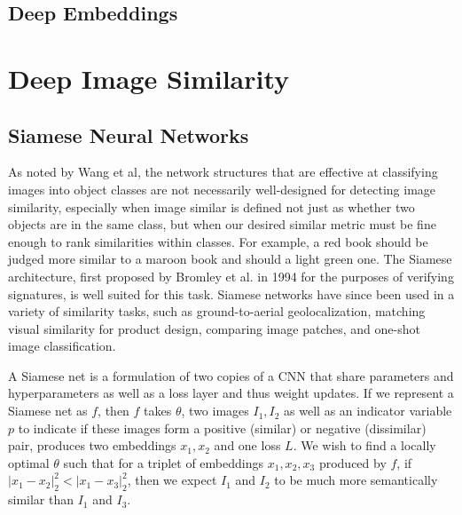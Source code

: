  \subsection{Deep Embeddings}
%


\section{Deep Image Similarity}
\subsection{Siamese Neural Networks}

As noted by Wang et al\cite{wang2014learning}, the network structures that are effective at classifying images into object classes are not necessarily well-designed for detecting image similarity, especially when image similar is defined not just as whether two objects are in the same class, but when our desired similar metric must be fine enough to rank similarities within classes. For example, a red book should be judged more similar to a maroon book and should a light green one. The Siamese architecture, first proposed by Bromley et al. in 1994\cite{bromley1993signature} for the purposes of verifying signatures, is well suited for this task. Siamese networks have since been used in a variety of similarity tasks, such as ground-to-aerial geolocalization\cite{lin2015learning}, matching visual similarity for product design\cite{bell2015learning}, comparing image patches\cite{zagoruyko2015learning}, and one-shot image classification\cite{koch2015siamese}.

A Siamese net is a formulation of two copies of a CNN that share parameters and hyperparameters as well as a loss layer and thus weight updates. If we represent a Siamese net as $f$, then $f$ takes $\theta$, two images $I_1, I_2$ as well as an indicator variable $p$ to indicate if these images form a positive (similar) or negative (dissimilar) pair, produces two embeddings $x_1, x_2$ and one loss $L$. We wish to find a locally optimal $\theta$ such that for a triplet of embeddings $x_1, x_2, x_3$ produced by $f$, if $|x_1 - x_2|_2^2 < |x_1 - x_3|_2^2$, then we expect $I_1$ and $I_2$ to be much more semantically similar than $I_1$ and $I_3$.

